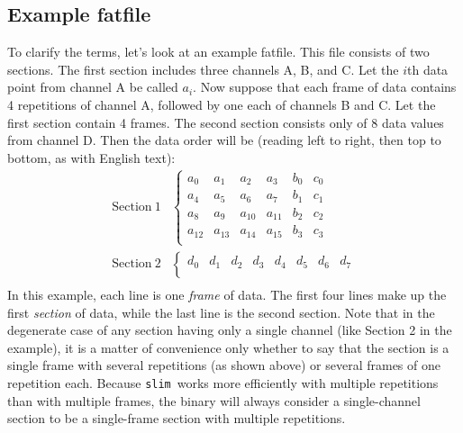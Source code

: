 \documentclass[11pt]{article}
\newcommand{\slim}{{\tt slim}}
\begin{document}
\subsection{Example fatfile}
To clarify the terms, let's look at an example fatfile.  This file
consists of two sections.  The first section includes three channels
A, B, and C.  Let the $i$th data point from channel A be called $a_i$.
Now suppose that each frame of data contains 4 repetitions of channel
A, followed by one each of channels B and C.  Let the first section
contain 4 frames.  The second section consists only of 8 data values from
channel D.  Then the data order will be (reading left to right, then
top to bottom, as with English text):
%
\begin{equation}
  \begin{array}{ll}
    \mathrm{Section\ 1}  &
    \left \{ 
    \begin{array}{cccccc}
      a_0 & a_1  & a_2 & a_3 & b_0 & c_0 \\
      a_4 & a_5  & a_6 & a_7 & b_1 & c_1 \\
      a_8 & a_9  & a_{10} & a_{11} & b_2 & c_2 \\
      a_{12} & a_{13} & a_{14} & a_{15} & b_3 & c_3 \\
    \end{array}
    \right. \\
    
    \mathrm{Section\ 2} &
    \left \{
    \begin{array}{cccccccc}
      d_0 & d_1 & d_2 & d_3 & d_4 & d_5 & d_6 & d_7 \\
    \end{array} \right. \\
  \end{array}
\end{equation}
%
In this example, each line is one \emph{frame} of data. The first four
lines make up the first \emph{section} of data, while the last line is
the second section.  Note that in the degenerate case of any section
having only a single channel (like Section 2 in the example), it is a
matter of convenience only whether to say that the section 
is a single frame with several repetitions (as shown above) or several
frames of one repetition each.  Because \slim\ works more efficiently
with multiple repetitions than with multiple frames, the binary will
always consider a single-channel section to be a single-frame section
with multiple repetitions.
\end{document}
